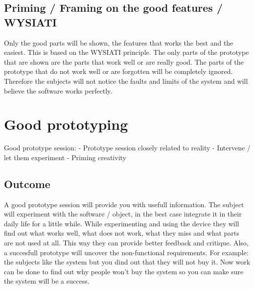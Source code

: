 \documentclass{article}
\begin{document}
\subsection{Priming / Framing on the good features / WYSIATI}
Only the good parts will be shown, the features that works the best and the easiest.
This is based on the WYSIATI principle. The only parts of the prototype
that are shown are the parts that work well or are really good. The parts of
the prototype that do not work well or are forgotten will be completely ignored.
Therefore the subjects will not notice the faults and limits of the system
and will believe the software works perfectly.


\section{Good prototyping}

Good prototype session:
- Prototype session closely related to reality
- Intervene / let them experiment
- Priming creativity 

 
\subsection{Outcome}
A good prototype session will provide you with usefull information. The subject
will experiment with the software / object, in the best case integrate it in their
daily life for a little while. While experimenting and using the device they will
find out what works well, what does not work, what they miss and what parts
are not used at all. This way they can provide better feedback and critique.
Also, a succesfull prototype will uncover the non-functional requirements.
For example: the subjects like the system but you dind out that they will not
buy it. Now work can be done to find out why people won't buy the system so you can make sure the system will be a success.





\end{document}
